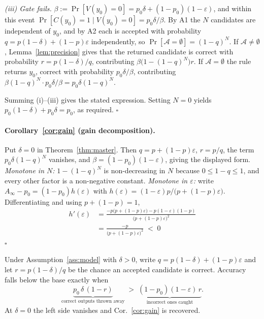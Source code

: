 \documentclass[11pt]{article}
\begin{document}
\emph{(iii) Gate fails.} $\beta:=\Pr[V(y_0){=}0]=p_0\delta+(1-p_0)(1-\varepsilon)$, and within this event $\Pr[C(y_0){=}1\mid V(y_0){=}0]=p_0\delta/\beta$. By A1 the $N$ candidates are independent of $y_0$, and by A2 each is accepted with probability $q=p(1-\delta)+(1-p)\varepsilon$ independently, so $\Pr[\mathcal{A}=\emptyset]=(1-q)^N$.
If $\mathcal{A}\neq\emptyset$, Lemma~\ref{lem:precision} gives that the returned candidate is correct with probability $r=p(1-\delta)/q$, contributing $\beta\bigl(1-(1-q)^N\bigr)r$.
If $\mathcal{A}=\emptyset$ the rule returns $y_0$, correct with probability $p_0\delta/\beta$, contributing $\beta(1-q)^N\cdot p_0\delta/\beta=p_0\delta(1-q)^N$.

Summing (i)--(iii) gives the stated expression. Setting $N=0$ yields $p_0(1-\delta)+p_0\delta=p_0$, as required. \hfill$\square$

\paragraph{Corollary~\ref{cor:gain} (gain decomposition).}
Put $\delta=0$ in Theorem~\ref{thm:master}. Then $q=p+(1-p)\varepsilon$, $r=p/q$, the term $p_0\delta(1-q)^N$ vanishes, and $\beta=(1-p_0)(1-\varepsilon)$, giving the displayed form.
\emph{Monotone in $N$:} $1-(1-q)^N$ is non-decreasing in $N$ because $0\le1-q\le1$, and every other factor is a non-negative constant.
\emph{Monotone in $\varepsilon$:} write $A_\infty-p_0=(1-p_0)h(\varepsilon)$ with $h(\varepsilon)=(1-\varepsilon)p/\bigl(p+(1-p)\varepsilon\bigr)$. Differentiating and using $p+(1-p)=1$,
\[
\begin{aligned}
h'(\varepsilon)&=\frac{-p\bigl(p+(1-p)\varepsilon\bigr)-p(1-\varepsilon)(1-p)}{\bigl(p+(1-p)\varepsilon\bigr)^{2}}\\[2pt]
&=\frac{-p}{\bigl(p+(1-p)\varepsilon\bigr)^{2}}\;<\;0
\end{aligned}
\]
\hfill$\square$

\begin{corollary}[Degradation]\label{cor:degrade}
Under Assumption~\ref{ass:model} with $\delta>0$, write
$q=p(1-\delta)+(1-p)\varepsilon$ and let $r=p(1-\delta)/q$ be the chance an
accepted candidate is correct. Accuracy falls below the base exactly when
\[
\underbrace{p_0\,\delta\,(1-r)}_{\text{correct outputs thrown away}}\;>\;
\underbrace{(1-p_0)(1-\varepsilon)\,r}_{\text{incorrect ones caught}} .
\]
At $\delta=0$ the left side vanishes and Cor.~\ref{cor:gain} is recovered.
\end{corollary}
\end{document}
